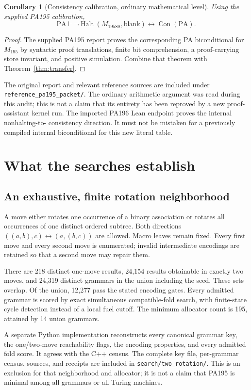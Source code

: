 \documentclass[11pt,letterpaper]{article}
\newtheorem{corollary}[theorem]{Corollary}
\newcommand{\PA}{\mathrm{PA}}
\newcommand{\Con}{\operatorname{Con}}
\newcommand{\Halt}{\operatorname{Halt}}
\newcommand{\file}[1]{\texttt{\nolinkurl{#1}}}
\newcommand{\Mnew}{M_{\mathrm{195S8}}}
\newcommand{\Mold}{M_{\mathrm{195}}}
\begin{document}
\begin{corollary}[Consistency calibration, ordinary mathematical level]
Using the supplied PA195 calibration,
\[
\PA\vdash
\neg\Halt(\Mnew,\mathrm{blank})\longleftrightarrow\Con(\PA).
\]
\end{corollary}
\begin{proof}
The supplied PA195 report proves the corresponding PA biconditional
for $\Mold$ by syntactic proof translations, finite bit comprehension,
a proof-carrying store invariant, and positive simulation.
Combine that theorem with Theorem~\ref{thm:transfer}.
\end{proof}
The original report and relevant reference sources are included under
\file{reference_pa195_packet/}. The ordinary arithmetic argument was
read during this audit; this is not a claim that its entirety has been
reproved by a new proof-assistant kernel run.
The imported PA196 Lean endpoint proves the internal nonhalting-to-
consistency direction. It must not be mistaken for a previously
compiled internal biconditional for this new literal table.

\section{What the searches establish}
\label{sec:search}
\subsection{An exhaustive, finite rotation neighborhood}
A move either rotates one occurrence of a binary association or rotates
all occurrences of one distinct ordered subtree. Both directions
$((a,b),c)\leftrightarrow(a,(b,c))$ are allowed. Macro leaves remain
fixed. Every first move and every second move is enumerated; invalid
intermediate encodings are retained so that a second move may repair
them.

There are 218 distinct one-move results, 24,154 results obtainable
in exactly two moves, and 24,319 distinct grammars in the union
including the seed. These sets overlap. Of the union, 12,277 pass
the stated encoding gates. Every admitted grammar is scored by exact
simultaneous compatible-fold search, with finite-state cycle detection
instead of a local fuel cutoff. The minimum allocator count is 195,
attained by 14 union grammars.

A separate Python implementation reconstructs every canonical grammar
key, the one/two-move reachability flags, the encoding properties,
and every admitted fold score. It agrees with the C++ census.
The complete key file, per-grammar census, sources, and receipts are
included in \file{search/two_rotation/}.
This is an exclusion for that neighborhood and allocator; it is not a
claim that PA195 is minimal among all grammars or all Turing machines.
\end{document}
